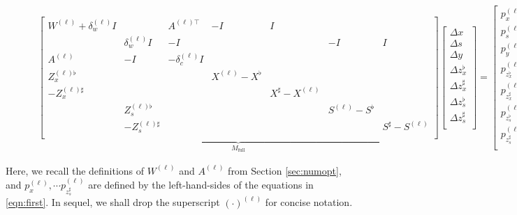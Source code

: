 \begin{figure}[h!]
  \begin{align}\label{eqn:very-long-eqn}
    \underbrace{
    \begin{bmatrix}
      W^{(\ell)}  + \delta^{(\ell)}_w I & & A^{(\ell)\top}& -I & I &  \\
      & \delta^{(\ell)}_w I & -I&&&-I & I\\
      A^{(\ell)}& -I & -\delta^{(\ell)}_c I\\
      Z_x^{(\ell)\flat}&&&X^{(\ell)}-X^\flat\\
      -Z_x^{(\ell)\sharp}&&&&X^\sharp-X^{(\ell)}\\
      &Z_s^{(\ell)\flat}&&&&S^{(\ell)}-S^\flat\\
      &-Z_s^{(\ell)\sharp}&&&&&S^\sharp-S^{(\ell)}\\
    \end{bmatrix}
    }_{M_\text{full}}
    \begin{bmatrix}
      \Delta x \\
      \Delta s \\
      \Delta y \\
      \Delta z_x^\flat \\
      \Delta z_x^\sharp \\
      \Delta z_s^\flat \\
      \Delta z_s^\sharp \\
    \end{bmatrix} =
    \begin{bmatrix}
      p^{(\ell)}_{x }\\
      p^{(\ell)}_{s }\\
      p^{(\ell)}_{y }\\
      p^{(\ell)}_{z_x^\flat }\\
      p^{(\ell)}_{z_x^\sharp }\\
      p^{(\ell)}_{z_s^\flat }\\
      p^{(\ell)}_{z_s^\sharp }\\
    \end{bmatrix}
  \end{align}
\end{figure}
Here, we recall the definitions of $W^{(\ell)}$ and $A^{(\ell)}$ from Section \ref{sec:numopt}, and 
$p^{(\ell)}_x,\cdots p^{(\ell)}_{z_s^\sharp}$ are defined by the left-hand-sides of the equations in
\eqref{eqn:first}. In sequel, we shall drop the superscript
$(\cdot)^{(\ell)}$ for concise notation.

